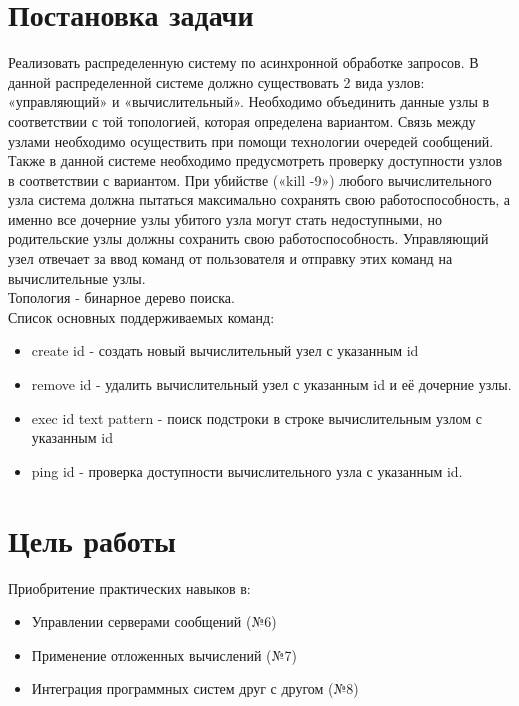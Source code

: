 \tableofcontents
\pagebreak
\section*{Постановка задачи}
Реализовать распределенную систему по асинхронной обработке запросов. В данной
распределенной системе должно существовать 2 вида узлов: «управляющий» и
«вычислительный». Необходимо объединить данные узлы в соответствии с той топологией,
которая определена вариантом. Связь между узлами необходимо осуществить при помощи
технологии очередей сообщений. Также в данной системе необходимо предусмотреть проверку
доступности узлов в соответствии с вариантом. При убийстве («kill -9») любого вычислительного
узла система должна пытаться максимально сохранять свою работоспособность, а именно все
дочерние узлы убитого узла могут стать недоступными, но родительские узлы должны сохранить
свою работоспособность.
Управляющий узел отвечает за ввод команд от пользователя и отправку этих команд на
вычислительные узлы. \\ Топология - бинарное дерево поиска. \\ Список основных поддерживаемых команд:
\begin{itemize}
    \item create id - создать новый вычислительный узел с указанным id
    \item remove id - удалить вычислительный узел с указанным id и её дочерние узлы.
    \item exec id text pattern - поиск подстроки в строке вычислительным узлом с указанным id 
    \item ping id - проверка доступности вычислительного узла с указанным id.
\end{itemize}

\section*{Цель работы}
Приобритение практических навыков в:
\begin{itemize}
    \item Управлении серверами сообщений (№6)
    \item Применение отложенных вычислений (№7)
    \item Интеграция программных систем друг с другом (№8)
\end{itemize}


